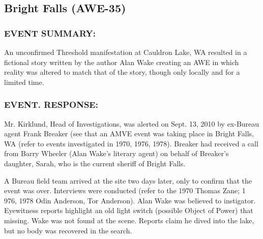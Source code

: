 \subsection*{Bright Falls (AWE-35)}
\subsubsection*{EVENT SUMMARY:}
\par An unconfirmed Threshold manifestation at Cauldron Lake, WA
resulted in a fictional story written by the author Alan Wake
creating an AWE in which reality was altered to match that of the
story, though only locally and for a limited time.
\subsubsection*{EVENT. RESPONSE:}
\par Mr. Kirklund, Head of Investigations, was alerted on Sept. 13,
2010 by ex-Bureau agent Frank Breaker (see  that an AMVE event was taking place in Bright Falls, WA (refer to events investigated in 1970, 1976, 1978). Breaker had received a
call from Barry Wheeler (Alan Wake's literary agent) on behalf of
Breaker's daughter, Sarah, who is the current sheriff of Bright
Falls.
\par A Bureau field team arrived at the site two days later, only to
confirm that the event was over. Interviews were conducted (refer
to the 1970  Thomas Zane; 1 976, 1978 Odin Anderson,
Tor Anderson). Alan Wake was believed to 
instigator. Eyewitness reports highlight
an old light switch (possible Object of Power) that 
missing. Wake was not found at the scene. Reports claim he dived into the lake, but no body was
recovered in the search.